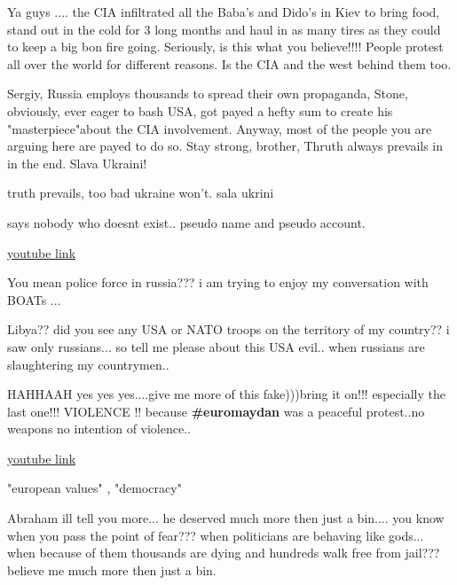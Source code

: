 \begin{itemize}
\begin{itemize}
Ya guys .... the CIA infiltrated all the Baba's and Dido's in Kiev to bring
food, stand out in the cold for 3 long months and haul in as many tires as they
could to keep a big bon fire going. Seriously, is this what you believe!!!!
People protest all over the world for different reasons. Is the CIA and the
west behind them too.


Sergiy, Russia employs thousands to spread their own propaganda, Stone,
obviously, ever eager to bash USA, got payed a hefty sum to create his
"masterpiece"about the CIA involvement. Anyway, most of the people you are
arguing here are payed to do so. Stay strong, brother, Thruth always prevails
in in the end. Slava Ukraini!

truth prevails, too bad ukraine won't. sala ukrini


says nobody who doesnt exist.. pseudo name and pseudo account.

\href{https://www.youtube.com/watch?v=u7Z0incwC2w}{youtube link}


You mean police force in russia??? i am trying to enjoy my conversation with BOATs ...


Libya?? did you see any USA or NATO troops on the territory of my country?? i
saw only russians... so tell me please about this USA evil.. when russians are
slaughtering my countrymen..


HAHHAAH yes yes yes....give me more of this fake)))bring it on!!! especially
the last one!!! VIOLENCE !! because \textbf{\#euromaydan} was a peaceful protest..no
weapons no intention of violence..

\href{https://www.youtube.com/watch?v=RJR1wz7muFI}{youtube link}

"european values" , "democracy"


Abraham ill tell you more... he deserved much more then just a bin.... you know
when you pass the point of fear??? when politicians are behaving like
gods... when because of them thousands are dying and hundreds walk free from
jail??? believe me much more then just a bin.



\end{itemize}
\end{itemize}
